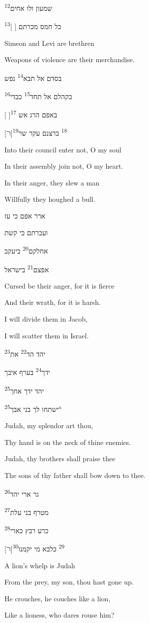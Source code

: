 {
	שמעון ולו אחים\textsuperscript{12}

	כל חמס מכרתם [ ]\textsuperscript{13}
}
{
	Simeon and Levi are brethren

	Weapons of violence are their merchandise.
}
{
}

{
	בסדם אל תבא\textsuperscript{14} נפש

	בקהלם אל תחד\textsuperscript{15} כבדי\textsuperscript{16}

	[ ]\textsuperscript{17} באפם הרג אש

	[ו־]\textsuperscript{18} ברצנם עקר שר\textsuperscript{19}
}
{
	Into their council enter not, O my soul

	In their assembly join not, O my heart.

	In their anger, they slew a man

	Willfully they houghed a bull.
}
{
}

{
	ארר אפם כי עז

	ועברתם כי קשת

	אחלקם\textsuperscript{20} ביעקב

	אפצם\textsuperscript{21} בישראל
}
{
	Cursed be their anger, for it is fierce

	And their wrath, for it is harsh.

	I will divide them in Jacob,

	I will scatter them in Israel.
}
{
}

{
	יהד הד\textsuperscript{22} את\textsuperscript{23}

	ידך\textsuperscript{24} בערף איבך

	יהד ידך אחך\textsuperscript{25}

	ישתחו לך בני אבך\textsuperscript{25a}
}
{
	Judah, my splendor art thou,

	Thy hand is on the neck of thine enemies.

	Judah, thy brothers shall praise thee

	The sons of thy father shall bow
	down to thee.
}
{
}

{
	גר ארי יהד\textsuperscript{26}

	מטרף בני עלת\textsuperscript{27}

	כרע רבץ כארי\textsuperscript{28}

	[ו־]\textsuperscript{29} כלבא מי יקמנו\textsuperscript{30}
}
{
	A lion's whelp is Judah

	From the prey, my son, thou hast gone up.

	He crouches, he couches like a lion,

	Like a lioness, who dares rouse him?
}
{
}

